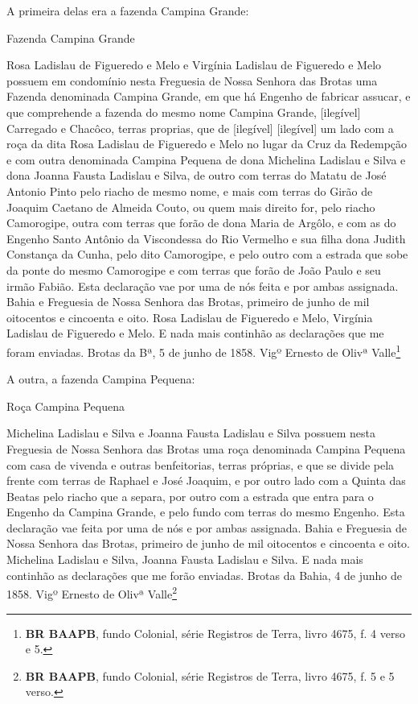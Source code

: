 A primeira delas era a fazenda Campina Grande:

\begin{citacao}
Fazenda Campina Grande

Rosa Ladislau de Figueredo e Melo e Virgínia Ladislau de Figueredo e Melo possuem em condomínio nesta Freguesia de Nossa Senhora das Brotas uma Fazenda denominada Campina Grande, em que há Engenho de fabricar assucar, e que comprehende a fazenda do mesmo nome Campina Grande, [ilegível] Carregado e Chacôco, terras proprias, que de [ilegível] [ilegível] um lado com a roça da dita Rosa Ladislau de Figueredo e Melo no lugar da Cruz da Redempção e com outra denominada Campina Pequena de dona Michelina Ladislau e Silva e dona Joanna Fausta Ladislau e Silva, de outro com terras do Matatu de José Antonio Pinto pelo riacho de mesmo nome, e mais com terras do Girão de Joaquim Caetano de Almeida Couto, ou quem mais direito for, pelo riacho Camorogipe, outra com terras que forão de dona Maria de Argôlo, e com as do Engenho Santo Antônio da Viscondessa do Rio Vermelho e sua filha dona Judith Constança da Cunha, pelo dito Camorogipe, e pelo outro com a estrada que sobe da ponte do mesmo Camorogipe e com terras que forão de João Paulo e seu irmão Fabião. Esta declaração vae por uma de nós feita e por ambas assignada. Bahia e Freguesia de Nossa Senhora das Brotas, primeiro de junho de mil oitocentos e cincoenta e oito. Rosa Ladislau de Figueredo e Melo, Virgínia Ladislau de Figueredo e Melo. E nada mais continhão as declarações que me foram enviadas. Brotas da Bª, 5 de junho de 1858. Vigº Ernesto de Olivª Valle\footnote{\textbf{BR BAAPB}, fundo Colonial, série Registros de Terra, livro 4675, f. 4 verso e 5.}
\end{citacao}

A outra, a fazenda Campina Pequena:

\begin{citacao}
Roça Campina Pequena

Michelina Ladislau e Silva e Joanna Fausta Ladislau e Silva possuem nesta Freguesia de Nossa Senhora das Brotas uma roça denominada Campina Pequena com casa de vivenda e outras benfeitorias, terras próprias, e que se divide pela frente com terras de Raphael e José Joaquim, e por outro lado com a Quinta das Beatas pelo riacho que a separa, por outro com a estrada que entra para o Engenho da Campina Grande, e pelo fundo com terras do mesmo Engenho. Esta declaração vae feita por uma de nós e por ambas assignada. Bahia e Freguesia de Nossa Senhora das Brotas, primeiro de junho de mil oitocentos e cincoenta e oito. Michelina Ladislau e Silva, Joanna Fausta Ladislau e Silva. E nada mais continhão as declarações que me forão enviadas. Brotas da Bahia, 4 de junho de 1858. Vigº Ernesto de Olivª Valle\footnote{\textbf{BR BAAPB}, fundo Colonial, série Registros de Terra, livro 4675, f. 5 e 5 verso.}
\end{citacao}

